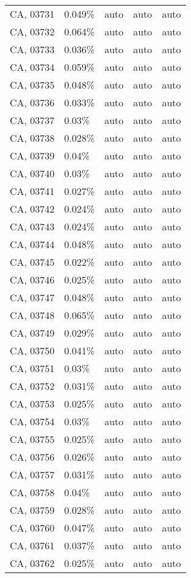\begin{longtable}[]{@{}lllll@{}}
CA, 03731 & 0.049\% & auto & auto & auto \\
CA, 03732 & 0.064\% & auto & auto & auto \\
CA, 03733 & 0.036\% & auto & auto & auto \\
CA, 03734 & 0.059\% & auto & auto & auto \\
CA, 03735 & 0.048\% & auto & auto & auto \\
CA, 03736 & 0.033\% & auto & auto & auto \\
CA, 03737 & 0.03\% & auto & auto & auto \\
CA, 03738 & 0.028\% & auto & auto & auto \\
CA, 03739 & 0.04\% & auto & auto & auto \\
CA, 03740 & 0.03\% & auto & auto & auto \\
CA, 03741 & 0.027\% & auto & auto & auto \\
CA, 03742 & 0.024\% & auto & auto & auto \\
CA, 03743 & 0.024\% & auto & auto & auto \\
CA, 03744 & 0.048\% & auto & auto & auto \\
CA, 03745 & 0.022\% & auto & auto & auto \\
CA, 03746 & 0.025\% & auto & auto & auto \\
CA, 03747 & 0.048\% & auto & auto & auto \\
CA, 03748 & 0.065\% & auto & auto & auto \\
CA, 03749 & 0.029\% & auto & auto & auto \\
CA, 03750 & 0.041\% & auto & auto & auto \\
CA, 03751 & 0.03\% & auto & auto & auto \\
CA, 03752 & 0.031\% & auto & auto & auto \\
CA, 03753 & 0.025\% & auto & auto & auto \\
CA, 03754 & 0.03\% & auto & auto & auto \\
CA, 03755 & 0.025\% & auto & auto & auto \\
CA, 03756 & 0.026\% & auto & auto & auto \\
CA, 03757 & 0.031\% & auto & auto & auto \\
CA, 03758 & 0.04\% & auto & auto & auto \\
CA, 03759 & 0.028\% & auto & auto & auto \\
CA, 03760 & 0.047\% & auto & auto & auto \\
CA, 03761 & 0.037\% & auto & auto & auto \\
CA, 03762 & 0.025\% & auto & auto & auto \\

\end{longtable}
